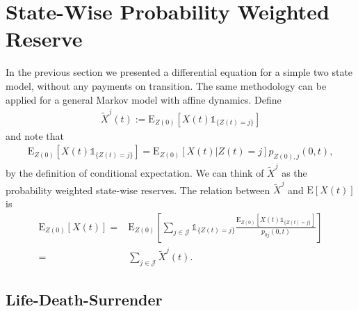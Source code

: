 \documentclass[12pt]{article}
\newcommand{\E}{\text{E}}
\newcommand{\indic}[1]{\mathds{1}_{ \{ #1 \} }}
\begin{document}
\section*{State-Wise Probability Weighted Reserve}
In the previous section we presented a differential equation for a simple two state model, without any payments on transition. The same methodology can be applied for a general Markov model with affine dynamics.
Define
\begin{align*}
\tilde{X}^j(t):=\E_{Z(0)}[X(t)\indic{Z(t)=j}]
\end{align*}
and note that
\begin{align}
\E_{Z(0)}[X(t)\indic{Z(t)=j}]= \E_{Z(0)}[X(t)|Z(t)=j]p_{Z(0),j}(0,t), \label{eq:1}
\end{align}
by the definition of conditional expectation. We can think of $\tilde{X}^j$ as the probability weighted state-wise reserves. The relation between $\tilde{X}^j$ and $\E[X(t)]$ is
\begin{align*}
\E_{Z(0)}[X(t)] =&
\E_{Z(0)} \left[ \sum_{j\in \mathcal{J}} \indic{Z(t)=j} \frac{\E_{Z(0)}[X(t)\indic{Z(t)=j}]}{p_{0j}(0,t)} \right]
\\
=&
\sum_{j\in \mathcal{J}} \tilde{X}^j(t).
\end{align*}




\subsection*{Life-Death-Surrender}
\def\PlA{(0,0)}
\begin{center}
\end{center}
\end{document}
